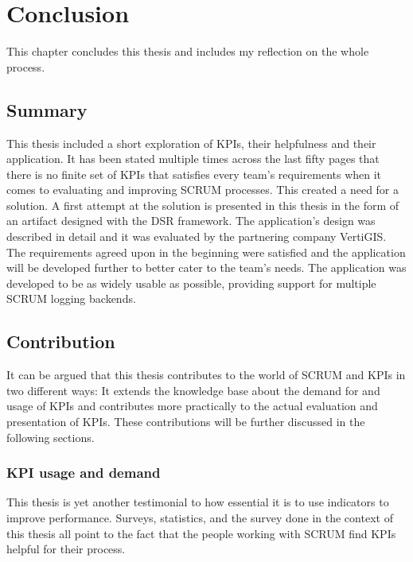 
\chapter{Conclusion} 
\label{Chapter7} 

This chapter concludes this thesis and includes my reflection on the whole process.

\section{Summary}

This thesis included a short exploration of KPIs, their helpfulness and their application.
It has been stated multiple times across the last fifty pages that there is no finite
set of KPIs that satisfies every team's requirements when it comes to evaluating and improving SCRUM processes.
This created a need for a solution.
A first attempt at the solution is presented in this thesis in the form of an artifact designed with the DSR framework.
The application's design was described in detail and it was evaluated by the partnering company VertiGIS.
The requirements agreed upon in the beginning were satisfied and the application will be developed further to better cater to the team's needs.
The application was developed to be as widely usable as possible, providing support for multiple SCRUM logging backends.


\section{Contribution}

It can be argued that this thesis contributes to the world of SCRUM and KPIs in two different ways: 
It extends the knowledge base about the demand for and usage of KPIs and contributes more practically to the actual evaluation and presentation of KPIs. 
These contributions will be further discussed in the following sections. 

\subsection{KPI usage and demand}

This thesis is yet another testimonial to how essential it is to use indicators to improve performance. 
Surveys, statistics, and the survey done in the context of this thesis all point to the fact that the people working with SCRUM find KPIs helpful for their process. 

